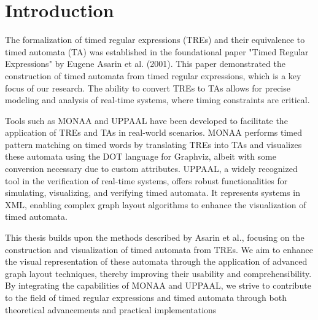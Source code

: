 \section{Introduction}
The formalization of timed regular expressions (TREs) and their equivalence to timed automata (TA) was established in the foundational paper "Timed Regular Expressions" by Eugene Asarin et al. (2001).
This paper demonstrated the construction of timed automata from timed regular expressions, which is a key focus of our research.
The ability to convert TREs to TAs allows for precise modeling and analysis of real-time systems, where timing constraints are critical.

Tools such as MONAA and UPPAAL have been developed to facilitate the application of TREs and TAs in real-world scenarios.
MONAA performs timed pattern matching on timed words by translating TREs into TAs and visualizes these automata using the DOT language for Graphviz, albeit with some conversion necessary due to custom attributes.
UPPAAL, a widely recognized tool in the verification of real-time systems, offers robust functionalities for simulating, visualizing, and verifying timed automata.
It represents systems in XML, enabling complex graph layout algorithms to enhance the visualization of timed automata.

This thesis builds upon the methods described by Asarin et al., focusing on the construction and visualization of timed automata from TREs.
We aim to enhance the visual representation of these automata through the application of advanced graph layout techniques, thereby improving their usability and comprehensibility.
By integrating the capabilities of MONAA and UPPAAL, we strive to contribute to the field of timed regular expressions and timed automata through both theoretical advancements and practical implementations